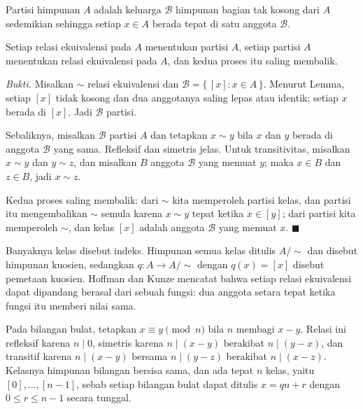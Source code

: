 \begin{definisi}[Partisi]
Partisi himpunan $A$ adalah keluarga $\mathcal{B}$ himpunan bagian tak kosong dari
$A$ sedemikian sehingga setiap $x \in A$ berada tepat di satu anggota $\mathcal{B}$.
\end{definisi}

\begin{teorema}
Setiap relasi ekuivalensi pada $A$ menentukan partisi $A$, setiap partisi $A$
menentukan relasi ekuivalensi pada $A$, dan kedua proses itu saling membalik.
\end{teorema}
\par\smallskip\noindent\textit{Bukti.} Misalkan $\sim$ relasi ekuivalensi dan
$\mathcal{B} = \{\, [x] : x \in A \,\}$. Menurut Lemma, setiap $[x]$ tidak kosong dan
dua anggotanya saling lepas atau identik; setiap $x$ berada di $[x]$. Jadi
$\mathcal{B}$ partisi.

Sebaliknya, misalkan $\mathcal{B}$ partisi $A$ dan tetapkan $x \sim y$ bila $x$ dan
$y$ berada di anggota $\mathcal{B}$ yang sama. Refleksif dan simetris jelas. Untuk
transitivitas, misalkan $x \sim y$ dan $y \sim z$, dan misalkan $B$ anggota
$\mathcal{B}$ yang memuat $y$; maka $x \in B$ dan $z \in B$, jadi $x \sim z$.

Kedua proses saling membalik: dari $\sim$ kita memperoleh partisi kelas, dan partisi
itu mengembalikan $\sim$ semula karena $x \sim y$ tepat ketika $x \in [y]$; dari
partisi kita memperoleh $\sim$, dan kelas $[x]$ adalah anggota $\mathcal{B}$ yang
memuat $x$.
\hfill$\blacksquare${\parfillskip=0pt\par}

Banyaknya kelas disebut indeks. Himpunan semua kelas ditulis $A/{\sim}$ dan disebut
himpunan kuosien, sedangkan $q : A \to A/{\sim}$ dengan $q(x) = [x]$ disebut pemetaan
kuosien. Hoffman dan Kunze mencatat bahwa setiap relasi ekuivalensi dapat dipandang
berasal dari sebuah fungsi: dua anggota setara tepat ketika fungsi itu memberi nilai
sama.

\begin{contoh}
Pada bilangan bulat, tetapkan $x \equiv y \pmod{n}$ bila $n$ membagi $x-y$. Relasi
ini refleksif karena $n \mid 0$, simetris karena $n \mid (x-y)$ berakibat
$n \mid (y-x)$, dan transitif karena $n \mid (x-y)$ bersama $n \mid (y-z)$ berakibat
$n \mid (x-z)$. Kelasnya himpunan bilangan bersisa sama, dan ada tepat $n$ kelas,
yaitu $[0], \dots, [n-1]$, sebab setiap bilangan bulat dapat ditulis $x = qn + r$
dengan $0 \le r \le n-1$ secara tunggal.
\end{contoh}

